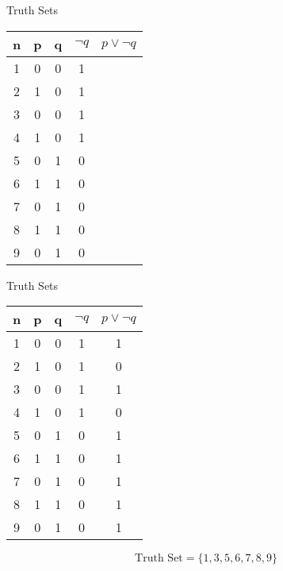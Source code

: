 \documentclass[12pt]{article}
\begin{document}

{Truth Sets}

\begin{center}
\begin{tabular}{|c||c|c||c||c|}
\hline \phantom{sp} n \phantom{sp} & \phantom{sp} p \phantom{sp} & \phantom{sp}q \phantom{sp}& \phantom{s} $\neg q$ \phantom{s}& \phantom{s} $p \vee \neg q$ \phantom{s}\\  \hline
\hline 1 & 0 & 0 & 1 & \\ 
\hline 2 & 1 & 0 & 1 & \\ 
\hline 3 & 0 & 0 & 1 & \\ 
\hline 4 & 1 & 0 & 1 & \\ 
\hline 5 & 0 & 1 & 0 & \\ 
\hline 6 & 1 & 1 & 0 & \\ 
\hline 7 & 0 & 1 & 0 & \\ 
\hline 8 & 1 & 1 & 0 & \\ 
\hline 9 & 0 & 1 & 0 & \\ 
\hline 
\end{tabular}
\end{center} 


{Truth Sets}

\begin{center}
\begin{tabular}{|c||c|c||c||c|}
\hline \phantom{sp} n \phantom{sp} & \phantom{sp} p \phantom{sp} & \phantom{sp}q \phantom{sp}& \phantom{s} $\neg q$ \phantom{s}& \phantom{s} $p \vee \neg q$ \phantom{s}\\  \hline
\hline 1 & 0 & 0 & 1 & 1\\ 
\hline 2 & 1 & 0 & 1 & 0\\ 
\hline 3 & 0 & 0 & 1 & 1\\ 
\hline 4 & 1 & 0 & 1 & 0\\ 
\hline 5 & 0 & 1 & 0 & 1\\ 
\hline 6 & 1 & 1 & 0 & 1\\ 
\hline 7 & 0 & 1 & 0 & 1\\ 
\hline 8 & 1 & 1 & 0 & 1\\ 
\hline 9 & 0 & 1 & 0 & 1\\ 
\hline 
\end{tabular}
\end{center} 
\[\mbox{Truth Set} = \{1,3,5,6,7,8,9\}\]
\end{document}
